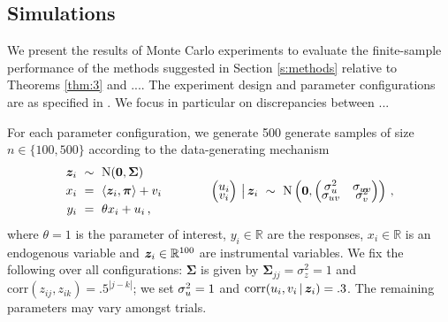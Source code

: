 \documentclass{uwstat572}
\newcommand{\benn}{\begin{equation*}}
\newcommand{\eenn}{\end{equation*}}
\theoremstyle{definition}
\theoremstyle{remark}
\newcommand{\R}{\ensuremath{\mathbb{R}}}
\newcommand{\Normal}{\mathrm{N}}
\newcommand{\bs}[1]{\boldsymbol{#1}}
\numberwithin{equation}{section}
\begin{document}
\subsection{Simulations}\label{ss:simulations}
\newcommand{\rpc}{\pi}
\newcommand{\rp}{\bs{\rpc}}
\newcommand{\rpj}{\rpc_j}
\newcommand{\rS}{\bs{\Sigma}}
\newcommand{\0}{\bs{0}}
\newcommand{\rt}{\theta}
\newcommand{\rtiv}{\hat{\rt}^\dagger}
\newcommand{\sdz}{\sigma_{z}}
\newcommand{\vrz}{\sdz^2}
\newcommand{\vry}{\sds^2}
\newcommand{\vrv}{\sdf^2}
\newcommand{\corr}{\mathrm{corr}}
\newcommand{\seh}{\hat{\mathrm{SE}}}
\newcommand{\ybar}{\bar{y}}
\newcommand{\fga}{\hat{\alpha}}
\newcommand{\lga}{\tilde{\alpha}}

\newcommand{\dhi}{\hat{d}_i}
\newcommand{\rdfl}{\hat{\rd}_{\fga}}
\newcommand{\rppl}{\hat{\rp}_{\mathrm{PL}}}
\newcommand{\rph}{\hat{\rp}}
\newcommand{\rphc}{\hat{\rpc}}
\newcommand{\Sh}{\hat{S}}
\newcommand{\rtfl}{\hat{\rt}_{\fga}}
\newcommand{\PS}{\P_{\Sh}}


We present the results of Monte Carlo experiments to evaluate the finite-sample performance of the methods suggested in Section \ref{s:methods} relative to Theorems \ref{thm:3} and .... The experiment design and parameter configurations are as specified in \cite[Section 5.3]{BCH11}. We focus in particular on discrepancies between ...  

For each parameter configuration, we generate 500 generate samples of size $n \in \{100, 500\}$ according to the data-generating mechanism
\benn
\begin{split}
	\z_i \ & \sim \ \Normal(\0, \rS) \\
	x_i \ & = \ \ipp{\z_i,\rp}{} +\efi \\
	y_i \ & = \ \rt x_i + \esi \,,
\end{split}\qquad\qquad
\begin{split}
	\begin{pmatrix} \esi \\[-.5em] \efi \end{pmatrix}\,\big{|}\,\z_i \ \sim \ \Normal\left(\bs{0}, \begin{pmatrix} \sds^2 & \sdfs \\[-.5em] \sdfs & 		\sdf^2 \end{pmatrix} \right)\,,
\end{split}
\eenn
where $\rt = 1$ is the parameter of interest, $y_i\in\R$ are the responses, $x_i\in\R$ is an endogenous variable and $\z_i\in\R^{100}$ are instrumental variables. We fix the following over all configurations: $\rS$ is given by $\rS_{jj} = \vrz = 1$ and $\corr(z_{ij}, z_{ik}) = .5^{|j-k|}$; we set $\vry = 1$ and $\corr(\esi, \efi \,|\, \z_i) = .3$. The remaining parameters may vary amongst trials.
\end{document}
